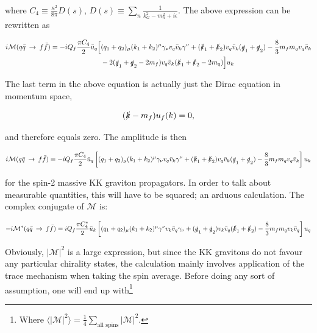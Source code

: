 \documentclass[11pt,a4paper]{article}
\begin{document}
 where $C_4 \equiv \frac{\kappa^2}{8\pi} D(s)$, $D(s) \equiv \sum_{n} \frac{1}{k_G^2 - m_n^2 + i\epsilon}$. The above expression can be rewritten as

\begin{align}
	\begin{split}
	i\mathcal{M}(q\bar{q}\:\rightarrow\:f\bar{f}) = -iQ_f\frac{\pi C_4}{2}\bar{u}_q\Big[&(q_1 + q_2)_ \mu(k_1+k_2)^\mu \gamma_\nu v_q\bar{v}_k\gamma^\nu + (\slashed k_1 + \slashed k_2)v_q\bar{v}_k(\slashed q_1 + \slashed q_2) - \frac{8}{3}m_fm_qv_q\bar{v}_k\\
	&-2(\slashed q_1 + \slashed q_2 - 2m_f)v_q\bar{v}_k(\slashed k_1 + \slashed k_2 - 2m_q)\Big]u_k
	\end{split}
\end{align}

The last term in the above equation is actually just the Dirac equation in momentum space,

\begin{equation}
	(\slashed k - m_f)u_f(k) = 0,
\end{equation}

and therefore equals zero. The amplitude is then

\begin{equation}
	i\mathcal{M}(q\bar{q}\:\rightarrow\:f\bar{f}) = -iQ_f\frac{\pi C_4}{2}\bar{u}_q\left[(q_1 + q_2)_ \mu(k_1+k_2)^\mu \gamma_\nu v_q\bar{v}_k\gamma^\nu + (\slashed k_1 + \slashed k_2)v_q\bar{v}_k(\slashed q_1 + \slashed q_2) - \frac{8}{3}m_fm_qv_q\bar{v}_k\right]u_k
\end{equation}

for the spin-2 massive KK graviton propagators. In order to talk about measurable quantities, this will have to be squared; an arduous calculation. The complex conjugate of $\mathcal{M}$ is:

\begin{equation}
	-i\mathcal{M}^*(q\bar{q}\:\rightarrow\:f\bar{f}) = iQ_f\frac{\pi C_4^*}{2}\bar{u}_k\left[(q_1 + q_2)_ \mu(k_1+k_2)^\mu \gamma^\nu v_k\bar{v}_q\gamma_\nu + (\slashed q_1 + \slashed q_2)v_k\bar{v}_q(\slashed k_1 + \slashed k_2) - \frac{8}{3}m_fm_qv_k\bar{v}_q\right]u_q
\end{equation}

Obviously, $|\mathcal{M}|^2$ is a large expression, but since the KK gravitons do not favour any particular chirality states, the calculation mainly involves application of the trace mechanism when taking the spin average. Before doing any sort of assumption, one will end up with\footnote{Where $\langle|\mathcal{M}|^2\rangle = \frac{1}{4}\sum_{\text{all spins}}|\mathcal{M}|^2$.}
\end{document}
